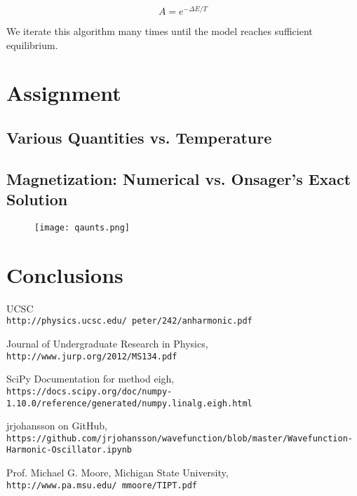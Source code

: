 \documentclass[12pt]{article}
\begin{document}
\begin{equation}
A = e^{-\Delta E / T}
\end{equation}

We iterate this algorithm many times until the model reaches sufficient equilibrium.

\section{Assignment}

\subsection*{Various Quantities vs. Temperature}


\subsection*{Magnetization: Numerical vs. Onsager's Exact Solution}


\begin{figure}[H]
\begin{center}
\texttt{[image: qaunts.png]}
\end{center}
\end{figure}


\section{Conclusions}




\begin{thebibliography}{9}

 UCSC
\\\texttt{http://physics.ucsc.edu/~peter/242/anharmonic.pdf}

Journal of Undergraduate Research in Physics, 
\\\texttt{http://www.jurp.org/2012/MS134.pdf}

SciPy Documentation for method eigh,
\\\texttt{https://docs.scipy.org/doc/numpy-1.10.0/reference/generated/numpy.linalg.eigh.html}

jrjohansson on GitHub, 
\\\texttt{https://github.com/jrjohansson/wavefunction/blob/master/Wavefunction-Harmonic-Oscillator.ipynb}

Prof. Michael G. Moore, Michigan State University, 
\\\texttt{http://www.pa.msu.edu/~mmoore/TIPT.pdf}


\end{thebibliography}
\end{document}
